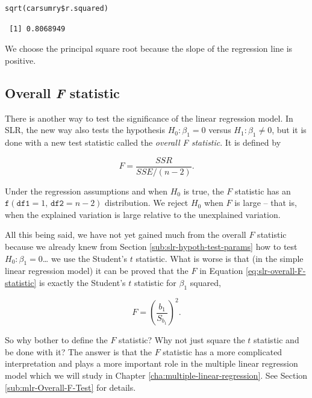 \documentclass[captions=tableheading]{scrbook}
\begin{document}
\begin{verbatim}
sqrt(carsumry$r.squared)
\end{verbatim}

\begin{verbatim}
 [1] 0.8068949
\end{verbatim}

We choose the principal square root because the slope of the regression line is positive.
\subsection{Overall \emph{F} statistic}
\label{sec-11-3-3}

\label{sub:slr-overall-F-statistic}

There is another way to test the significance of the linear regression model. In SLR, the new way also tests the hypothesis \(H_{0}:\beta_{1}=0\) versus \(H_{1}:\beta_{1}\neq0\), but it is done with a new test statistic called the \emph{overall F statistic}. It is defined by

\begin{equation}
F=\frac{SSR}{SSE/(n-2)}.\label{eq:slr-overall-F-statistic}
\end{equation}

Under the regression assumptions and when \(H_{0}\) is true, the \(F\) statistic has an \(\mathtt{f}(\mathtt{df1}=1,\,\mathtt{df2}=n-2)\) distribution. We reject \(H_{0}\) when \(F\) is large -- that is, when the explained variation is large relative to the unexplained variation.

All this being said, we have not yet gained much from the overall \(F\) statistic because we already knew from Section \ref{sub:slr-hypoth-test-params} how to test \(H_{0}:\beta_{1}=0\)\ldots{} we use the Student's \(t\) statistic. What is worse is that (in the simple linear regression model) it can be proved that the \(F\) in Equation \ref{eq:slr-overall-F-statistic} is exactly the Student's \(t\) statistic for \(\beta_{1}\) squared,

\begin{equation}
F=\left(\frac{b_{1}}{S_{b_{1}}}\right)^{2}.
\end{equation}

So why bother to define the \(F\) statistic? Why not just square the \(t\) statistic and be done with it? The answer is that the \(F\) statistic has a more complicated interpretation and plays a more important role in the multiple linear regression model which we will study in Chapter \ref{cha:multiple-linear-regression}. See Section \ref{sub:mlr-Overall-F-Test} for details.
\end{document}
